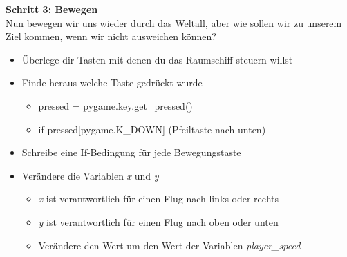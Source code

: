 \textbf{Schritt 3: Bewegen}\\
Nun bewegen wir uns wieder durch das Weltall, aber wie sollen wir zu unserem Ziel kommen, wenn wir nicht ausweichen können?
\begin{itemize}
	\item Überlege dir Tasten mit denen du das Raumschiff steuern willst
	\item Finde heraus welche Taste gedrückt wurde
	\begin{itemize}
		\item pressed = pygame.key.get\_pressed()
		\item if pressed[pygame.K\_DOWN] (Pfeiltaste nach unten)
	\end{itemize}
	\item Schreibe eine If-Bedingung für jede Bewegungstaste
	\item Verändere die Variablen \textit{x} und \textit{y}
	\begin{itemize}
		\item \textit{x} ist verantwortlich für einen Flug nach links oder rechts
		\item \textit{y} ist verantwortlich für einen Flug nach oben oder unten
		\item Verändere den Wert um den Wert der Variablen \textit{player\_speed}
	\end{itemize}	 
\end{itemize}